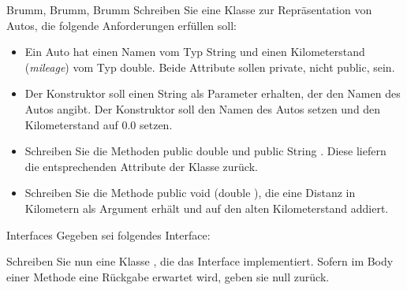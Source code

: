 \documentclass{../preamble}
\begin{document}
\clearpage

\begin{task}[credit = \stars{1}{3}]{Brumm, Brumm, Brumm}
    Schreiben Sie eine Klasse  zur Repräsentation von Autos, die folgende Anforderungen erfüllen soll:
    \begin{itemize}
        \item Ein Auto hat einen Namen vom Typ \textcolor{keywordcolor}{String} und einen Kilometerstand (\textit{mileage}) vom Typ \textcolor{keywordcolor}{double}. Beide Attribute sollen \textcolor{keywordcolor}{private}, nicht \textcolor{keywordcolor}{public}, sein.
        \item Der Konstruktor soll einen \textcolor{keywordcolor}{String} als Parameter erhalten, der den Namen des Autos angibt. Der Konstruktor soll den Namen des Autos setzen und den Kilometerstand auf \(0.0\) setzen.
        \item Schreiben Sie die Methoden \textcolor{keywordcolor}{public} \textcolor{keywordcolor}{double}  und \textcolor{keywordcolor}{public} {String} . Diese liefern die entsprechenden Attribute der Klasse  zurück.
        \item Schreiben Sie die Methode \textcolor{keywordcolor}{public} \textcolor{keywordcolor}{void} (\textcolor{keywordcolor}{double} ), die eine Distanz in Kilometern als Argument erhält und auf den alten Kilometerstand addiert.
    \end{itemize}

    \begin{solution}
        
    \end{solution}
\end{task}

\clearpage

\begin{task}[credit = \stars{1}{3}]{Interfaces}
    Gegeben sei folgendes Interface:
    
    Schreiben Sie nun eine Klasse , die das Interface  implementiert. Sofern im Body einer Methode eine Rückgabe erwartet wird, geben sie \textcolor{keywordcolor}{null} zurück.

    \begin{solution}
        
    \end{solution}
\end{task}
\end{document}
